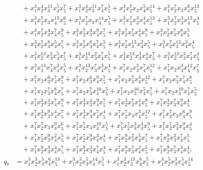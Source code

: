 \documentclass[reqno]{amsart}
\theoremstyle{plain}
\theoremstyle{definition}
\theoremstyle{plain}
\theoremstyle{definition}
\numberwithin{equation}{section}
\begin{document}
\begin{align*}
&\quad + x_1^{3}x_2^{4}x_3^{11}x_4^{5}x_5^{7} + x_1^{3}x_2^{4}x_3^{11}x_4^{7}x_5^{5} + x_1^{3}x_2^{7}x_3x_4^{5}x_5^{14} + x_1^{3}x_2^{7}x_3x_4^{6}x_5^{13}\\ 
&\quad + x_1^{3}x_2^{7}x_3x_4^{13}x_5^{6} + x_1^{3}x_2^{7}x_3x_4^{14}x_5^{5} + x_1^{3}x_2^{7}x_3^{3}x_4^{4}x_5^{13} + x_1^{3}x_2^{7}x_3^{3}x_4^{13}x_5^{4}\\ 
&\quad + x_1^{3}x_2^{7}x_3^{4}x_4^{7}x_5^{9} + x_1^{3}x_2^{7}x_3^{4}x_4^{9}x_5^{7} + x_1^{3}x_2^{7}x_3^{7}x_4^{4}x_5^{9} + x_1^{3}x_2^{7}x_3^{7}x_4^{8}x_5^{5}\\ 
&\quad + x_1^{3}x_2^{7}x_3^{8}x_4^{5}x_5^{7} + x_1^{3}x_2^{7}x_3^{8}x_4^{7}x_5^{5} + x_1^{3}x_2^{7}x_3^{13}x_4^{2}x_5^{5} + x_1^{3}x_2^{7}x_3^{13}x_4^{3}x_5^{4}\\ 
&\quad + x_1^{3}x_2^{13}x_3^{2}x_4^{5}x_5^{7} + x_1^{3}x_2^{13}x_3^{2}x_4^{7}x_5^{5} + x_1^{3}x_2^{13}x_3^{3}x_4^{4}x_5^{7} + x_1^{3}x_2^{13}x_3^{3}x_4^{7}x_5^{4}\\ 
&\quad + x_1^{3}x_2^{13}x_3^{7}x_4^{2}x_5^{5} + x_1^{3}x_2^{13}x_3^{7}x_4^{3}x_5^{4} + x_1^{7}x_2x_3^{3}x_4^{7}x_5^{12} + x_1^{7}x_2x_3^{3}x_4^{12}x_5^{7}\\ 
&\quad + x_1^{7}x_2x_3^{6}x_4^{7}x_5^{9} + x_1^{7}x_2x_3^{6}x_4^{9}x_5^{7} + x_1^{7}x_2x_3^{7}x_4^{3}x_5^{12} + x_1^{7}x_2x_3^{7}x_4^{7}x_5^{8}\\ 
&\quad + x_1^{7}x_2x_3^{7}x_4^{8}x_5^{7} + x_1^{7}x_2x_3^{7}x_4^{10}x_5^{5} + x_1^{7}x_2x_3^{10}x_4^{5}x_5^{7} + x_1^{7}x_2x_3^{10}x_4^{7}x_5^{5}\\ 
&\quad + x_1^{7}x_2^{3}x_3^{4}x_4^{7}x_5^{9} + x_1^{7}x_2^{3}x_3^{4}x_4^{9}x_5^{7} + x_1^{7}x_2^{3}x_3^{7}x_4^{4}x_5^{9} + x_1^{7}x_2^{3}x_3^{7}x_4^{9}x_5^{4}\\ 
&\quad + x_1^{7}x_2^{3}x_3^{9}x_4^{4}x_5^{7} + x_1^{7}x_2^{3}x_3^{9}x_4^{7}x_5^{4} + x_1^{7}x_2^{7}x_3x_4^{3}x_5^{12} + x_1^{7}x_2^{7}x_3x_4^{6}x_5^{9}\\ 
&\quad + x_1^{7}x_2^{7}x_3x_4^{9}x_5^{6} + x_1^{7}x_2^{7}x_3x_4^{10}x_5^{5} + x_1^{7}x_2^{7}x_3^{3}x_4^{4}x_5^{9} + x_1^{7}x_2^{7}x_3^{3}x_4^{9}x_5^{4}\\ 
&\quad + x_1^{7}x_2^{7}x_3^{9}x_4^{2}x_5^{5} + x_1^{7}x_2^{7}x_3^{9}x_4^{3}x_5^{4} + x_1^{7}x_2^{9}x_3^{2}x_4^{5}x_5^{7} + x_1^{7}x_2^{9}x_3^{2}x_4^{7}x_5^{5}\\ 
&\quad + x_1^{7}x_2^{9}x_3^{3}x_4^{4}x_5^{7} + x_1^{7}x_2^{9}x_3^{3}x_4^{7}x_5^{4} + x_1^{7}x_2^{9}x_3^{7}x_4^{2}x_5^{5} + x_1^{7}x_2^{9}x_3^{7}x_4^{3}x_5^{4},\\
q_7 &= x_1^{3}x_2^{3}x_3^{5}x_4^{6}x_5^{13} + x_1^{3}x_2^{3}x_3^{5}x_4^{14}x_5^{5} + x_1^{3}x_2^{3}x_3^{13}x_4^{6}x_5^{5} + x_1^{3}x_2^{5}x_3^{3}x_4^{5}x_5^{14}\\ 

\end{align*}
\end{document}
